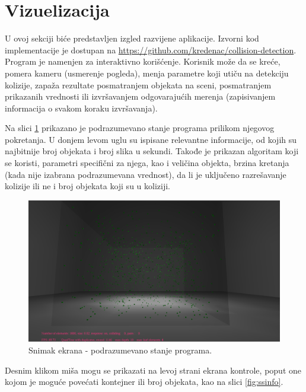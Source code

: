 \documentclass[12pt,oneside]{memoir}
\begin{document}
\section{Vizuelizacija}

U ovoj sekciji biće predstavljen izgled razvijene aplikacije. 
Izvorni kod implementacije je dostupan na \url{https://github.com/kredenac/collision-detection}.
Program je namenjen za interaktivno korišćenje. 
Korisnik može da se kreće, pomera kameru (usmerenje pogleda), menja parametre koji utiču na detekciju kolizije,
zapaža rezultate posmatranjem objekata na sceni, posmatranjem prikazanih vrednosti ili izvršavanjem odgovarajućih merenja
(zapisivanjem informacija o svakom koraku izvršavanja).

Na slici \ref{fig:ssdefault} prikazano je podrazumevano stanje programa prilikom njegovog pokretanja.
U donjem levom uglu su ispisane relevantne informacije, od kojih su najbitnije broj objekata 
i broj slika u sekundi. Takođe je prikazan algoritam koji se koristi, parametri specifični za njega, kao 
i veličina objekta, brzina kretanja (kada nije izabrana podrazumevana vrednost),  da li je uključeno razrešavanje kolizije ili ne  i
broj objekata koji su u koliziji.

\begin{figure}[h!]
	\centerfloat
	\includegraphics[scale=0.3]{ssdefault.png}
	\caption{Snimak ekrana - podrazumevano stanje programa.}
	\label{fig:ssdefault}
\end{figure}

\noindent Desnim klikom miša mogu se prikazati 
na levoj strani ekrana kontrole,
poput one kojom je moguće povećati kontejner ili broj objekata, kao na slici \ref{fig:ssinfo}.
\end{document}

